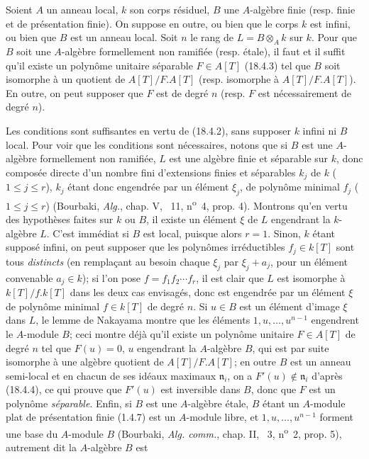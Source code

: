 \begin{proposition}[18.4.5]
\label{IV.18.4.5}
Soient $A$ un anneau local, $k$ son corps résiduel, $B$ une $A$-algèbre finie (resp. finie et de présentation finie). On suppose en outre, ou bien que le corps $k$ est infini, ou bien que $B$ est un anneau local. Soit $n$ le rang de $L=B\otimes_A k$ sur $k$. Pour que $B$ soit une $A$-algèbre formellement non ramifiée (resp. étale), il faut et il suffit qu'il existe un polynôme unitaire séparable $F\in A[T]$ (18.4.3) tel que $B$ soit isomorphe à un quotient de $A[T]/F.A[T]$ (resp. isomorphe à $A[T]/F.A[T]$). En outre, on peut supposer que $F$ est de degré $n$ (resp. $F$ est nécessairement de degré $n$).
\end{proposition}

Les conditions sont suffisantes en vertu de (18.4.2), sans supposer $k$ infini ni $B$ local. Pour voir que les conditions sont nécessaires, notons que si $B$ est une $A$-algèbre formellement non ramifiée, $L$ est une algèbre finie et séparable sur $k$, donc composée directe d'un nombre fini d'extensions finies et séparables $k_j$ de $k$ ($1\leq j\leq r$), $k_j$ étant donc engendrée par un élément $\xi_j$, de polynôme minimal $f_j$ ($1\leq j\leq r$) (Bourbaki, \emph{Alg.}, chap. V, \textsection~11, n\textsuperscript{o}~4, prop. 4). Montrons qu'en vertu des hypothèses faites sur $k$ ou $B$, il existe un élément $\xi$ de $L$ engendrant la $k$-algèbre $L$. C'est immédiat si $B$ est local, puisque alors $r=1$. Sinon, $k$ étant supposé infini, on peut supposer que les polynômes irréductibles $f_j\in k[T]$ sont tous \emph{distincts} (en remplaçant au besoin chaque $\xi_j$ par $\xi_j+a_j$, pour un élément convenable $a_j\in k$); si l'on pose $f=f_1f_2\cdots f_r$, il est clair que $L$ est isomorphe à $k[T]/f.k[T]$ dans les deux cas envisagés, donc est engendrée par un élément $\xi$ de polynôme minimal $f\in k[T]$ de degré $n$. Si $u\in B$ est un élément d'image $\xi$ dans $L$, le lemme de Nakayama montre que les éléments $1,u,\ldots,u^{n-1}$ engendrent le $A$-module $B$; ceci montre déjà qu'il existe un polynôme unitaire $F\in A[T]$ de degré $n$ tel que $F(u)=0$, $u$ engendrant la $A$-algèbre $B$, qui est par suite isomorphe à une algèbre quotient de $A[T]/F.A[T]$; en outre $B$ est un anneau semi-local et en chacun de ses idéaux maximaux $\mathfrak n_i$, on a $F'(u)\notin\mathfrak n_i$ d'après (18.4.4), ce qui prouve que $F'(u)$ est inversible dans $B$, donc que $F$ est un polynôme \emph{séparable}. Enfin, si $B$ est une $A$-algèbre étale, $B$ étant un $A$-module plat de présentation finie (1.4.7) est un $A$-module libre, et $1,u,\ldots,u^{n-1}$ forment une base du $A$-module $B$ (Bourbaki, \emph{Alg. comm.}, chap. II, \textsection~3, n\textsuperscript{o}~2, prop. 5), autrement dit la $A$-algèbre $B$ est

